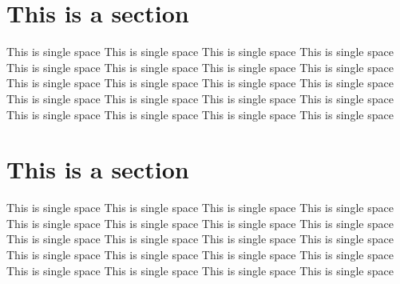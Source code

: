 \documentclass[titlepage]{article}
\begin{document}
\section{This is a section}
\begin{singlespace}
This is single space This is single space This is single space This is single space This is single space This is single space This is single space This is single space  This is single space This is single space This is single space This is single space  This is single space This is single space This is single space This is single space  This is single space This is single space This is single space This is single space  
\end{singlespace}

\section{This is a section}
\begin{singlespace}
This is single space This is single space This is single space This is single space This is single space This is single space This is single space This is single space  This is single space This is single space This is single space This is single space  This is single space This is single space This is single space This is single space  This is single space This is single space This is single space This is single space  
\end{singlespace}

\newpage


\end{document}
